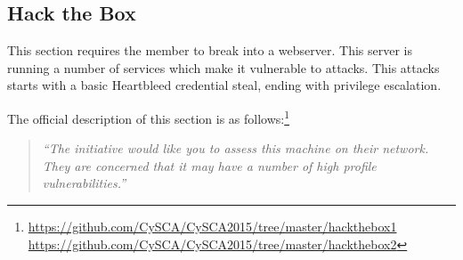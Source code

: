 \documentclass[a4paper,11pt]{report}
\begin{document}
			
		\subsection{Hack the Box}
			This section requires the member to break into a webserver. 
			This server is running a number of services which make it vulnerable to attacks. 
			This attacks starts with a basic Heartbleed credential steal, ending with privilege escalation. 

			The official description of this section is as follows:\footnote{\url{https://github.com/CySCA/CySCA2015/tree/master/hackthebox1}\\\qquad\url{https://github.com/CySCA/CySCA2015/tree/master/hackthebox2}} 
			\begin{quote}
				\textit{``The initiative would like you to assess this machine on their network. They are concerned that it may have a number of high profile vulnerabilities.''}
			\end{quote}
\end{document}

